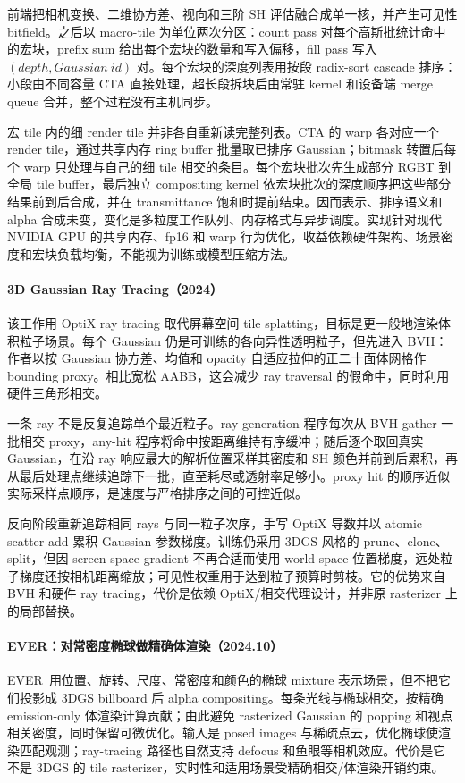 前端把相机变换、二维协方差、视向和三阶 SH 评估融合成单一核，并产生可见性 bitfield。之后以 macro-tile 为单位两次分区：count pass 对每个高斯批统计命中的宏块，prefix sum 给出每个宏块的数量和写入偏移，fill pass 写入 $(depth,Gaussian\ id)$ 对。每个宏块的深度列表用按段 radix-sort cascade 排序：小段由不同容量 CTA 直接处理，超长段拆块后由常驻 kernel 和设备端 merge queue 合并，整个过程没有主机同步。

宏 tile 内的细 render tile 并非各自重新读完整列表。CTA 的 warp 各对应一个 render tile，通过共享内存 ring buffer 批量取已排序 Gaussian；bitmask 转置后每个 warp 只处理与自己的细 tile 相交的条目。每个宏块批次先生成部分 RGBT 到全局 tile buffer，最后独立 compositing kernel 依宏块批次的深度顺序把这些部分结果前到后合成，并在 transmittance 饱和时提前结束。因而表示、排序语义和 alpha 合成未变，变化是多粒度工作队列、内存格式与异步调度。实现针对现代 NVIDIA GPU 的共享内存、fp16 和 warp 行为优化，收益依赖硬件架构、场景密度和宏块负载均衡，不能视为训练或模型压缩方法。

\paragraph{3D Gaussian Ray Tracing（2024）\cite{2407_07090}}
该工作用 OptiX ray tracing 取代屏幕空间 tile splatting，目标是更一般地渲染体积粒子场景。每个 Gaussian 仍是可训练的各向异性透明粒子，但先进入 BVH：作者以按 Gaussian 协方差、均值和 opacity 自适应拉伸的正二十面体网格作 bounding proxy。相比宽松 AABB，这会减少 ray traversal 的假命中，同时利用硬件三角形相交。

一条 ray 不是反复追踪单个最近粒子。ray-generation 程序每次从 BVH gather 一批相交 proxy，any-hit 程序将命中按距离维持有序缓冲；随后逐个取回真实 Gaussian，在沿 ray 响应最大的解析位置采样其密度和 SH 颜色并前到后累积，再从最后处理点继续追踪下一批，直至耗尽或透射率足够小。proxy hit 的顺序近似实际采样点顺序，是速度与严格排序之间的可控近似。

反向阶段重新追踪相同 rays 与同一粒子次序，手写 OptiX 导数并以 atomic scatter-add 累积 Gaussian 参数梯度。训练仍采用 3DGS 风格的 prune、clone、split，但因 screen-space gradient 不再合适而使用 world-space 位置梯度，远处粒子梯度还按相机距离缩放；可见性权重用于达到粒子预算时剪枝。它的优势来自 BVH 和硬件 ray tracing，代价是依赖 OptiX/相交代理设计，并非原 rasterizer 上的局部替换。

\paragraph{EVER：对常密度椭球做精确体渲染（2024.10）}
EVER~\cite{2410_01804}用位置、旋转、尺度、常密度和颜色的椭球 mixture 表示场景，但不把它们投影成 3DGS billboard 后 alpha compositing。每条光线与椭球相交，按精确 emission-only 体渲染计算贡献；由此避免 rasterized Gaussian 的 popping 和视点相关密度，同时保留可微优化。输入是 posed images 与稀疏点云，优化椭球使渲染匹配观测；ray-tracing 路径也自然支持 defocus 和鱼眼等相机效应。代价是它不是 3DGS 的 tile rasterizer，实时性和适用场景受精确相交/体渲染开销约束。


